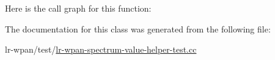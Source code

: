 Here is the call graph for this function\+:




The documentation for this class was generated from the following file\+:\begin{DoxyCompactItemize}
\item 
lr-\/wpan/test/\hyperlink{lr-wpan-spectrum-value-helper-test_8cc}{lr-\/wpan-\/spectrum-\/value-\/helper-\/test.\+cc}\end{DoxyCompactItemize}
